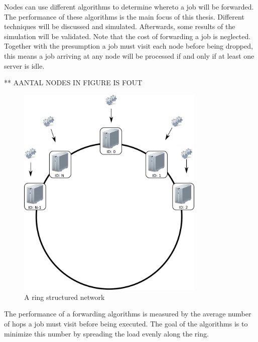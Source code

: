\documentclass[10pt,a4paper]{article}
\begin{document}
Nodes can use different algorithms to determine whereto a job will be forwarded. The performance of these algorithms is the main focus of this thesis. Different techniques will be discussed and simulated. Afterwards, some results of the simulation will be validated.
Note that the cost of forwarding a job is neglected. Together with the presumption a job must visit each node before being dropped, this means a job arriving at any node will be processed if and only if at least one server is idle.

** AANTAL NODES IN FIGURE IS FOUT

\begin{figure}[h!tb]
\centering
\includegraphics[width=0.8\textwidth,clip=true,trim=0px 225px 0px 0px]{resources/ring.pdf}
\caption{A ring structured network}
\label{figring}
\end{figure}

The performance of a forwarding algorithms is measured by the average number of hops a job must visit before being executed. The goal of the algorithms is to minimize this number by spreading the load evenly along the ring. 


%
\end{document}
